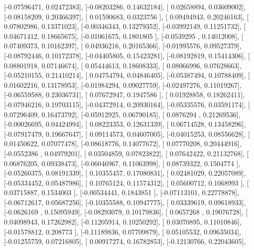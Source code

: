 \documentclass{article}
\begin{document}
       [-0.07596471,  0.02472383],
       [-0.08203286,  0.14632184],
       [ 0.02658894,  0.03609002],
       [-0.08158209,  0.20366397],
       [ 0.01590683,  0.0323756 ],
       [ 0.09494943,  0.20246163],
       [ 0.07802986,  0.13371023],
       [-0.00346343,  0.13279352],
       [-0.03992149,  0.11251732],
       [ 0.04671412,  0.18665675],
       [-0.01061675,  0.1801805 ],
       [-0.0539295 ,  0.14012008],
       [ 0.07409373,  0.10162397],
       [ 0.04936216,  0.20165366],
       [-0.01995576,  0.09527379],
       [-0.08792446,  0.10172378],
       [-0.04405805,  0.15423281],
       [-0.08192819,  0.15414306],
       [ 0.08801918,  0.07146674],
       [ 0.05444613,  0.18608333],
       [ 0.08066996,  0.07628663],
       [-0.05210155,  0.21410214],
       [ 0.04754794,  0.04846405],
       [-0.05387494,  0.10788409],
       [ 0.01602216,  0.13178953],
       [-0.01984294,  0.09027759],
       [-0.02497276,  0.11019267],
       [-0.06559588,  0.23036731],
       [ 0.07672947,  0.1947586 ],
       [ 0.01928858,  0.18262411],
       [-0.07946216,  0.19703115],
       [-0.04372914,  0.20930164],
       [-0.05335576,  0.03591174],
       [ 0.07296409,  0.16473792],
       [-0.05912925,  0.06790185],
       [ 0.0876294 ,  0.21269536],
       [-0.00026695,  0.04424994],
       [ 0.08223353,  0.12631339],
       [ 0.06714528,  0.13458296],
       [-0.07917479,  0.19667647],
       [ 0.09114573,  0.04607005],
       [-0.04015253,  0.08556628],
       [ 0.01450622,  0.07077478],
       [-0.08618776,  0.14077672],
       [ 0.07770208,  0.20444916],
       [-0.0552386 ,  0.04979201],
       [ 0.03504859,  0.07823822],
       [ 0.07642422,  0.21132768],
       [ 0.06876205,  0.09338473],
       [-0.06046967,  0.11063998],
       [ 0.08739322,  0.1504774 ],
       [-0.05260375,  0.08191339],
       [ 0.10355457,  0.17080831],
       [ 0.02481029,  0.22057089],
       [-0.05334452,  0.05487986],
       [ 0.10765124,  0.11574312],
       [ 0.05600712,  0.1068993 ],
       [ 0.03715887,  0.1534003 ],
       [-0.00534441,  0.1843851 ],
       [-0.07113101,  0.22778878],
       [-0.06712617,  0.05687256],
       [-0.10355588,  0.10947775],
       [ 0.03339619,  0.09618933],
       [-0.0626169 ,  0.15095949],
       [-0.08293079,  0.10179836],
       [ 0.0657268 ,  0.19076728],
       [ 0.04098943,  0.17262982],
       [-0.11205914,  0.10250292],
       [ 0.03070895,  0.11010846],
       [-0.01578812,  0.208773  ],
       [-0.11189836,  0.07709879],
       [ 0.05105532,  0.09635034],
       [-0.01255759,  0.07216805],
       [ 0.00917274,  0.16782853],
       [-0.12130766,  0.22043605],
\end{document}
